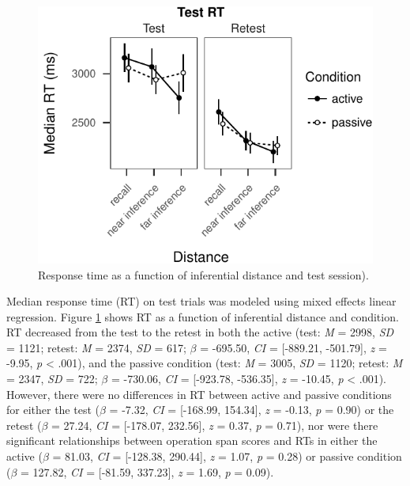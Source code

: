 \documentclass[floatsintext,man]{apa6}
\theoremstyle{definition}
\theoremstyle{definition}
\theoremstyle{definition}
\theoremstyle{remark}
\begin{document}
\begin{figure}
\centering
\includegraphics{active_transitive_inference_files/figure-latex/unnamed-chunk-4-1.pdf}
\caption{\label{fig:unnamed-chunk-4}Response time as a function of
inferential distance and test session). \label{fig_rt}}
\end{figure}

Median response time (RT) on test trials was modeled using mixed effects
linear regression. Figure \ref{fig_rt} shows RT as a function of
inferential distance and condition. RT decreased from the test to the
retest in both the active (test: \emph{M} = 2998, \emph{SD} = 1121;
retest: \emph{M} = 2374, \emph{SD} = 617; \(\beta\) = -695.50, \emph{CI}
= {[}-889.21, -501.79{]}, \emph{z} = -9.95, \emph{p} \textless{} .001),
and the passive condition (test: \emph{M} = 3005, \emph{SD} = 1120;
retest: \emph{M} = 2347, \emph{SD} = 722; \(\beta\) = -730.06, \emph{CI}
= {[}-923.78, -536.35{]}, \emph{z} = -10.45, \emph{p} \textless{} .001).
However, there were no differences in RT between active and passive
conditions for either the test (\(\beta\) = -7.32, \emph{CI} =
{[}-168.99, 154.34{]}, \emph{z} = -0.13, \emph{p} = 0.90) or the retest
(\(\beta\) = 27.24, \emph{CI} = {[}-178.07, 232.56{]}, \emph{z} = 0.37,
\emph{p} = 0.71), nor were there significant relationships between
operation span scores and RTs in either the active (\(\beta\) = 81.03,
\emph{CI} = {[}-128.38, 290.44{]}, \emph{z} = 1.07, \emph{p} = 0.28) or
passive condition (\(\beta\) = 127.82, \emph{CI} = {[}-81.59, 337.23{]},
\emph{z} = 1.69, \emph{p} = 0.09).
\end{document}

